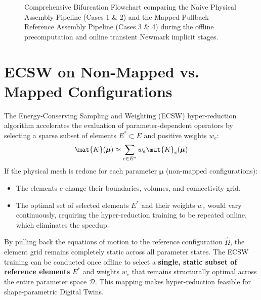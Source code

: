 \begin{figure}[p]
{%
    }
    \caption{Comprehensive Bifurcation Flowchart comparing the Naive Physical Assembly Pipeline (Cases 1 \& 2) and the Mapped Pullback Reference Assembly Pipeline (Cases 3 \& 4) during the offline precomputation and online transient Newmark implicit stages.}
    \label{fig:bifurcation_flowchart}
\end{figure}

\section{ECSW on Non-Mapped vs. Mapped Configurations}
The Energy-Conserving Sampling and Weighting (ECSW) hyper-reduction algorithm accelerates the evaluation of parameter-dependent operators by selecting a sparse subset of elements $E^* \subset E$ and positive weights $w_e$:
\begin{equation}
\mat{K}(\boldsymbol{\mu}) \approx \sum_{e \in E^*} w_e \mat{K}_e(\boldsymbol{\mu})
\end{equation}
If the physical mesh is redone for each parameter $\boldsymbol{\mu}$ (non-mapped configurations):
\begin{itemize}
    \item The elements $e$ change their boundaries, volumes, and connectivity grid.
    \item The optimal set of selected elements $E^*$ and their weights $w_e$ would vary continuously, requiring the hyper-reduction training to be repeated online, which eliminates the speedup.
\end{itemize}

By pulling back the equations of motion to the reference configuration $\hat{\Omega}$, the element grid remains completely static across all parameter states. The ECSW training can be conducted once offline to select a \textbf{single, static subset of reference elements} $E^*$ and weights $w_e$ that remains structurally optimal across the entire parameter space $\mathcal{D}$. This mapping makes hyper-reduction feasible for shape-parametric Digital Twins.

